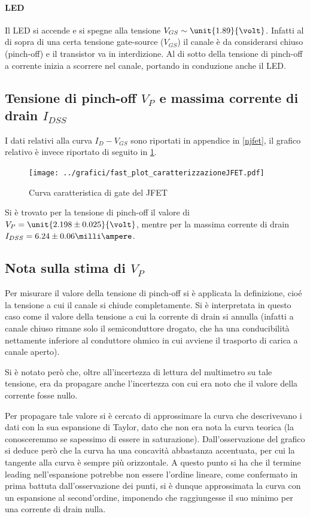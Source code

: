 \documentclass[10pt,a4paper]{article}
\begin{document}
\paragraph{LED} Il LED si accende e si spegne alla tensione $V_{GS} \sim \unit{1.89}{\volt}$. Infatti al di sopra di una certa tensione gate-source ($V_{GS}$) il canale è da considerarsi chiuso (pinch-off) e il transistor va in interdizione. Al di sotto della tensione di pinch-off a corrente inizia a scorrere nel canale, portando in conduzione anche il LED.

\subsection{Tensione di pinch-off $V_P$ e massima corrente di drain $I_{DSS}$}
I dati relativi alla curva $I_D - V_{GS}$ sono riportati in appendice in \tablename{\ref{njfet}}, il grafico relativo è invece riportato di seguito in \figurename{\ref{fig:njfet}}.

\begin{figure}[h!]
	\centering
	\texttt{[image: ../grafici/fast\_plot\_caratterizzazioneJFET.pdf]}
	\caption{Curva caratteristica di gate del JFET}
	\label{fig:njfet}
\end{figure}

Si è trovato per la tensione di pinch-off il valore di $V_P = \unit{2.198 \pm 0.025}{\volt} $, mentre per la massima corrente di drain $I_{DSS} = {6.24 \pm 0.06}{\milli\ampere} $.

\subsection{Nota sulla stima di $V_P$}
Per misurare il valore della tensione di pinch-off si è applicata la definizione, cioé la tensione a cui il canale si chiude completamente. Si è interpretata in questo caso come il valore della tensione a cui la corrente di drain si annulla (infatti a canale chiuso rimane solo il semiconduttore drogato, che ha una conducibilità nettamente inferiore al conduttore ohmico in cui avviene il trasporto di carica a canale aperto).

Si è notato però che, oltre all'incertezza di lettura del multimetro su tale tensione, era da propagare anche l'incertezza con cui era noto che il valore della corrente fosse nullo.

Per propagare tale valore si è cercato di approssimare la curva che descrivevano i dati con la sua espansione di Taylor, dato che non era nota la curva teorica (la conosceremmo se sapessimo di essere in saturazione).
Dall'osservazione del grafico si deduce però che la curva ha una concavità abbastanza accentuata, per cui la tangente alla curva è sempre più orizzontale. A questo punto si ha che il termine leading nell'espansione potrebbe non essere l'ordine lineare, come confermato in prima battuta dall'osservazione dei punti, si è dunque approssimata la curva con un espansione al second'ordine, imponendo che raggiungesse il suo minimo per una corrente di drain nulla.
\end{document}
